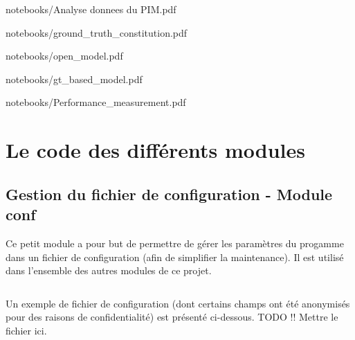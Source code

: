 \documentclass{report}
\begin{document}
        
                    {notebooks/Analyse donnees du PIM.pdf}

        
        {notebooks/ground_truth_constitution.pdf}

        
        {notebooks/open_model.pdf}
 
        
        {notebooks/gt_based_model.pdf}

        
        {notebooks/Performance_measurement.pdf}        
    
    \chapter{Le code des différents modules}

    \section{Gestion du fichier de configuration - Module conf}
    \label{code:conf}
    Ce petit module a pour but de permettre de gérer les paramètres du progamme dans un fichier de configuration (afin de simplifier la maintenance).
    Il est utilisé dans l'ensemble des autres modules de ce projet.

    \begin{multicols}{2}
    \begin{spacing}{1.0}
        \inputminted[fontsize=\tiny]{python}{../src/conf.py}
    \end{spacing}
    \end{multicols}

    Un exemple de fichier de configuration (dont certains champs ont été anonymisés pour des raisons de confidentialité) est présenté ci-dessous.
    TODO !! Mettre le fichier ici.
\end{document}
